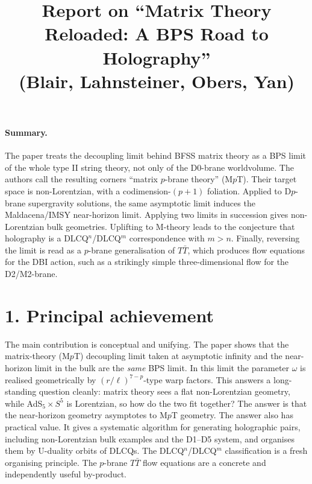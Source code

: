 \documentclass[11pt]{article}
\title{Report on ``Matrix Theory Reloaded: A BPS Road to Holography''\\
\large (Blair, Lahnsteiner, Obers, Yan)}
\date{}
\begin{document}
\maketitle

\paragraph{Summary.}
The paper treats the decoupling limit behind BFSS matrix theory as a BPS limit of the
whole type II string theory, not only of the D0-brane worldvolume. The authors call the
resulting corners ``matrix $p$-brane theory'' (M$p$T). Their target space is
non-Lorentzian, with a codimension-$(p+1)$ foliation. Applied to D$p$-brane
supergravity solutions, the same asymptotic limit induces the Maldacena/IMSY near-horizon
limit. Applying two limits in succession gives non-Lorentzian bulk geometries. Uplifting
to M-theory leads to the conjecture that holography is a DLCQ$^n$/DLCQ$^m$ correspondence
with $m>n$. Finally, reversing the limit is read as a $p$-brane generalisation of
$T\bar T$, which produces flow equations for the DBI action, such as a strikingly simple
three-dimensional flow for the D2/M2-brane.

\section*{1. Principal achievement}
The main contribution is conceptual and unifying. The paper shows that the matrix-theory
(M$p$T) decoupling limit taken at asymptotic infinity and the near-horizon limit in the
bulk are the \emph{same} BPS limit. In this limit the parameter $\omega$ is realised
geometrically by $(r/\ell)^{7-p}$-type warp factors. This answers a long-standing
question cleanly: matrix theory sees a flat non-Lorentzian geometry, while AdS$_5\times
S^5$ is Lorentzian, so how do the two fit together? The answer is that the near-horizon
geometry asymptotes to M$p$T geometry. The answer also has practical value. It gives a
systematic algorithm for generating holographic pairs, including non-Lorentzian bulk
examples and the D1--D5 system, and organises them by U-duality orbits of DLCQs. The
DLCQ$^n$/DLCQ$^m$ classification is a fresh organising principle. The $p$-brane $T\bar T$
flow equations are a concrete and independently useful by-product.
\end{document}
